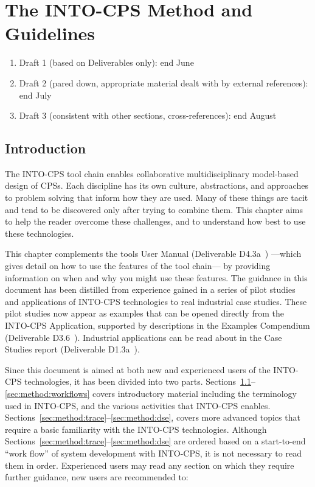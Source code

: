 \section{The INTO-CPS Method and Guidelines}\label{sec:method}

\begin{enumerate}
  \item Draft 1 (based on Deliverables only): end June
  \item Draft 2 (pared down, appropriate material dealt with by external references): end July
  \item Draft 3 (consistent with other sections, cross-references): end August
\end{enumerate}

\subsection{Introduction}
\label{sec:method:intro}

The INTO-CPS tool chain enables collaborative multidisciplinary model-based design of CPSs. Each discipline has its own culture, abstractions, and approaches to problem solving that inform how they are used. Many of these things are tacit and tend to be discovered only after trying to combine them. This chapter aims to help the reader overcome these challenges, and to understand how best to use these technologies.

This chapter complements the tools User Manual (Deliverable D4.3a~\cite{INTOCPSD4.3a}) ---which gives detail on how to use the features of the tool chain--- by providing information on when and why you might use these features. The guidance in this document has been distilled from experience gained in a series of pilot studies and applications of INTO-CPS technologies to real industrial case studies. These pilot studies now appear as examples that can be opened directly from the INTO-CPS Application, supported by descriptions in the Examples Compendium (Deliverable D3.6~\cite{INTOCPSD3.6}). Industrial applications can be read about in the Case Studies report (Deliverable D1.3a~\cite{INTOCPSD1.3a}).

Since this document is aimed at both new and experienced users of the INTO-CPS technologies, it has been divided into two parts. Sections~\ref{sec:method:intro}--\ref{sec:method:workflows} covers introductory material including the terminology used in INTO-CPS, and the various activities that INTO-CPS enables. Sections~\ref{sec:method:trace}--\ref{sec:method:dse}, covers more advanced topics that require a basic familiarity with the INTO-CPS technologies. Although Sections~\ref{sec:method:trace}--\ref{sec:method:dse} are ordered based on a start-to-end ``work flow'' of system development with INTO-CPS, it is not necessary to read them in order. Experienced users may read any section on which they require further guidance, new users are recommended to:

